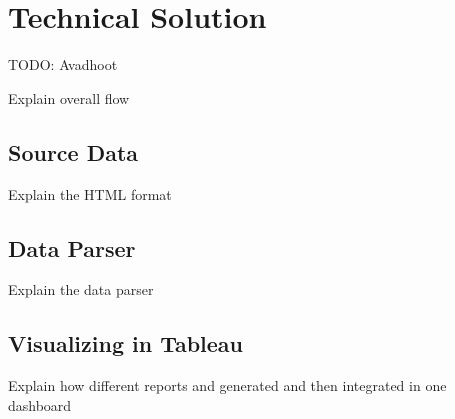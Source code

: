 \section{Technical Solution}

TODO: Avadhoot

Explain overall flow

\subsection{Source Data}
Explain the HTML format

\subsection{Data Parser}
Explain the data parser

\subsection{Visualizing in Tableau}
Explain how different reports and generated and then integrated in one dashboard



